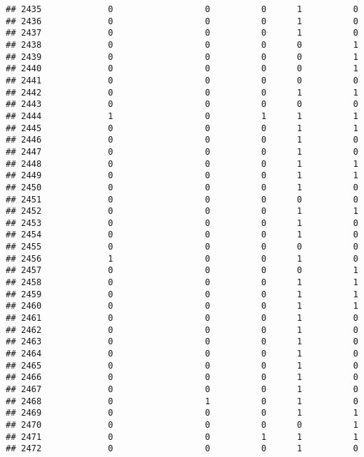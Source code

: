 \documentclass[
]{article}
\begin{document}
\begin{verbatim}
## 2435             0                  0          0      1          0
## 2436             0                  0          0      1          0
## 2437             0                  0          0      1          0
## 2438             0                  0          0      0          1
## 2439             0                  0          0      0          1
## 2440             0                  0          0      0          1
## 2441             0                  0          0      0          0
## 2442             0                  0          0      1          1
## 2443             0                  0          0      0          0
## 2444             1                  0          1      1          1
## 2445             0                  0          0      1          1
## 2446             0                  0          0      1          0
## 2447             0                  0          0      1          0
## 2448             0                  0          0      1          1
## 2449             0                  0          0      1          1
## 2450             0                  0          0      1          0
## 2451             0                  0          0      0          0
## 2452             0                  0          0      1          1
## 2453             0                  0          0      1          0
## 2454             0                  0          0      1          0
## 2455             0                  0          0      0          0
## 2456             1                  0          0      1          0
## 2457             0                  0          0      0          1
## 2458             0                  0          0      1          1
## 2459             0                  0          0      1          1
## 2460             0                  0          0      1          1
## 2461             0                  0          0      1          0
## 2462             0                  0          0      1          0
## 2463             0                  0          0      1          0
## 2464             0                  0          0      1          0
## 2465             0                  0          0      1          0
## 2466             0                  0          0      1          0
## 2467             0                  0          0      1          0
## 2468             0                  1          0      1          0
## 2469             0                  0          0      1          1
## 2470             0                  0          0      0          1
## 2471             0                  0          1      1          1
## 2472             0                  0          0      1          0

\end{verbatim}
\end{document}
